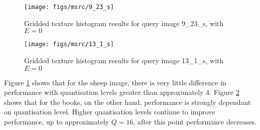 \begin{figure}[ht]
	\begin{minipage}[]{0.3\linewidth}
		\centering
		\texttt{[image: figs/msrc/9\_23\_s]}
	\end{minipage}
	\begin{minipage}[]{0.7\linewidth}
		\centering
	\end{minipage}
	\caption{Gridded texture histogram results for query image 9\_23\_s, with $E=0$}
	\label{fig:grid-text-sheep}
\end{figure}

\begin{figure}[ht]
	\begin{minipage}[]{0.3\linewidth}
		\centering
		\texttt{[image: figs/msrc/13\_1\_s]}
	\end{minipage}
	\begin{minipage}[]{0.7\linewidth}
		\centering
	\end{minipage}
	\caption{Gridded texture histogram results for query image 13\_1\_s, with $E=0$}
	\label{fig:grid-text-books}
\end{figure}

Figure \ref{fig:grid-text-sheep} shows that for the sheep image, there is very little difference in performance with quantisation levels greater than approximately 4. Figure \ref{fig:grid-text-books} shows that for the books, on the other hand, performance is strongly dependant on quantisation level. Higher quantisation levels continue to improve performance, up to approximately $Q=16$, after this point performance decreases.

